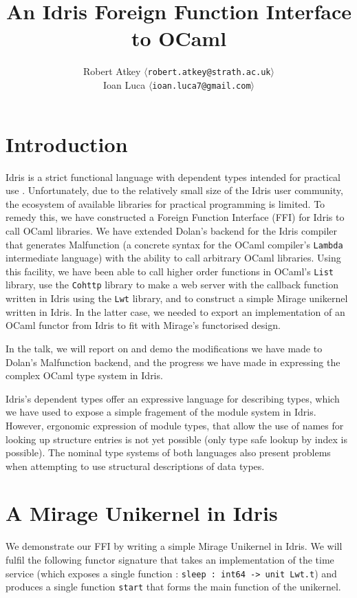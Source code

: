 \documentclass[a4paper,10pt,twocolumn]{article}
\title{An Idris Foreign Function Interface to OCaml}
\author{Robert Atkey  $\langle$\texttt{robert.atkey@strath.ac.uk}$\rangle$ \\
  Ioan Luca $\langle$\texttt{ioan.luca7@gmail.com}$\rangle$}
\date{}
\begin{document}
\maketitle

\section{Introduction}

Idris is a strict functional language with dependent types intended
for practical use \cite{tdd}. Unfortunately, due to the relatively
small size of the Idris user community, the ecosystem of available
libraries for practical programming is limited. To remedy this, we
have constructed a Foreign Function Interface (FFI) for Idris to call
OCaml libraries. We have extended Dolan's backend
\cite{dolan2016malfunctional} for the Idris compiler that generates
Malfunction (a concrete syntax for the OCaml compiler's
\texttt{Lambda} intermediate language) with the ability to call
arbitrary OCaml libraries. Using this facility, we have been able to
call higher order functions in OCaml's \texttt{List} library, use the
\texttt{Cohttp} library to make a web server with the callback
function written in Idris using the \texttt{Lwt} library, and to
construct a simple Mirage unikernel written in Idris. In the latter
case, we needed to export an implementation of an OCaml functor from
Idris to fit with Mirage's functorised design.

In the talk, we will report on and demo the modifications we have made
to Dolan's Malfunction backend, and the progress we have made in
expressing the complex OCaml type system in Idris.

Idris's dependent types offer an expressive language for describing
types, which we have used to expose a simple fragement of the module
system in Idris.  However, ergonomic expression of module types, that
allow the use of names for looking up structure entries is not yet
possible (only type safe lookup by index is possible). The nominal
type systems of both languages also present problems when attempting
to use structural descriptions of data types.

\section{A Mirage Unikernel in Idris}

We demonstrate our FFI by writing a simple Mirage Unikernel in
Idris. We will fulfil the following functor signature that takes an
implementation of the time service (which exposes a single function :
\texttt{sleep : int64 -> unit Lwt.t}) and produces a single function
\texttt{start} that forms the main function of the unikernel.
\end{document}
